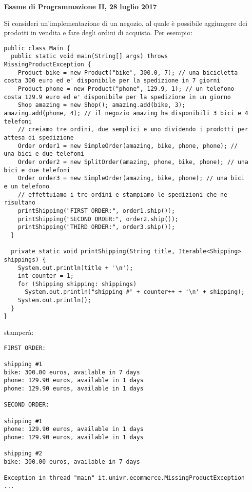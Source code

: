\documentclass{article}[10pt]
\begin{document}
\begin{center} {\bf Esame di Programmazione II, 28 luglio 2017}\end{center}

Si consideri un'implementazione di un negozio, al quale \`e possibile
aggiungere dei prodotti in vendita e fare degli ordini di acquisto. Per esempio:

{\scriptsize\begin{verbatim}
public class Main {
  public static void main(String[] args) throws MissingProductException {
    Product bike = new Product("bike", 300.0, 7); // una bicicletta costa 300 euro ed e' disponibile per la spedizione in 7 giorni
    Product phone = new Product("phone", 129.9, 1); // un telefono costa 129.9 euro ed e' disponibile per la spedizione in un giorno
    Shop amazing = new Shop(); amazing.add(bike, 3); amazing.add(phone, 4); // il negozio amazing ha disponibili 3 bici e 4 telefoni
    // creiamo tre ordini, due semplici e uno dividendo i prodotti per attesa di spedizione
    Order order1 = new SimpleOrder(amazing, bike, phone, phone); // una bici e due telefoni
    Order order2 = new SplitOrder(amazing, phone, bike, phone); // una bici e due telefoni
    Order order3 = new SimpleOrder(amazing, bike, phone); // una bici e un telefono
    // effettuiamo i tre ordini e stampiamo le spedizioni che ne risultano
    printShipping("FIRST ORDER:", order1.ship());
    printShipping("SECOND ORDER:", order2.ship());
    printShipping("THIRD ORDER:", order3.ship());
  }

  private static void printShipping(String title, Iterable<Shipping> shippings) {
    System.out.println(title + '\n');
    int counter = 1;
    for (Shipping shipping: shippings)
      System.out.println("shipping #" + counter++ + '\n' + shipping);
    System.out.println();
  }
}
\end{verbatim}}
  
\noindent
stamper\`a:
{\scriptsize\begin{verbatim}
FIRST ORDER:

shipping #1
bike: 300.00 euros, available in 7 days
phone: 129.90 euros, available in 1 days
phone: 129.90 euros, available in 1 days

SECOND ORDER:

shipping #1
phone: 129.90 euros, available in 1 days
phone: 129.90 euros, available in 1 days

shipping #2
bike: 300.00 euros, available in 7 days

Exception in thread "main" it.univr.ecommerce.MissingProductException
...
\end{verbatim}}
\end{document}
